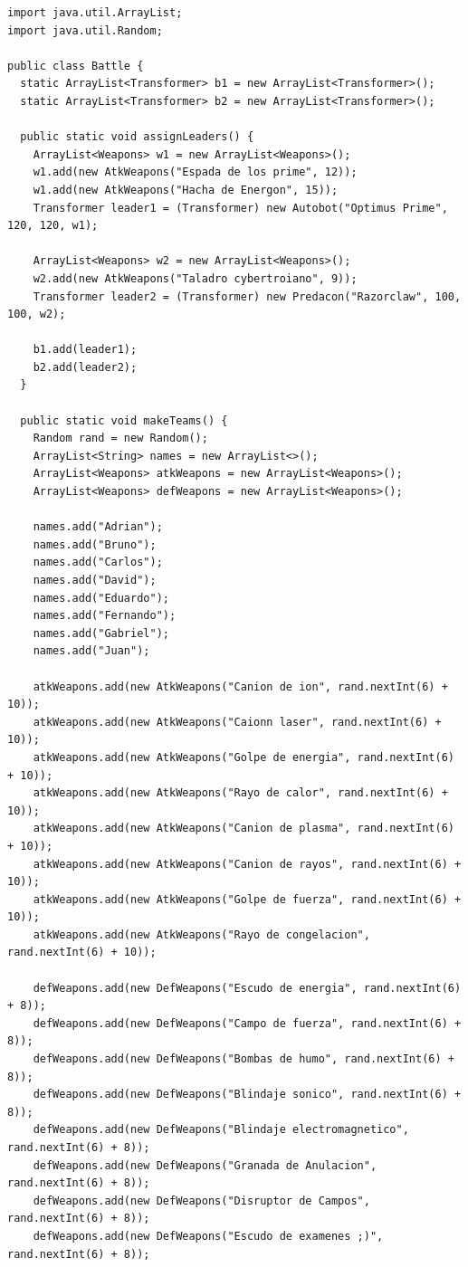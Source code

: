 \documentclass[12pt]{article}
\begin{document}
\begin{enumerate}[label = \arabic{enumi}]
\begin{lstlisting}
import java.util.ArrayList;
import java.util.Random;

public class Battle {
  static ArrayList<Transformer> b1 = new ArrayList<Transformer>();
  static ArrayList<Transformer> b2 = new ArrayList<Transformer>();
  
  public static void assignLeaders() {
    ArrayList<Weapons> w1 = new ArrayList<Weapons>();
    w1.add(new AtkWeapons("Espada de los prime", 12));
    w1.add(new AtkWeapons("Hacha de Energon", 15));
    Transformer leader1 = (Transformer) new Autobot("Optimus Prime", 120, 120, w1);

    ArrayList<Weapons> w2 = new ArrayList<Weapons>();
    w2.add(new AtkWeapons("Taladro cybertroiano", 9));
    Transformer leader2 = (Transformer) new Predacon("Razorclaw", 100, 100, w2);

    b1.add(leader1);
    b2.add(leader2);
  }

  public static void makeTeams() {
    Random rand = new Random();
    ArrayList<String> names = new ArrayList<>();
    ArrayList<Weapons> atkWeapons = new ArrayList<Weapons>();
    ArrayList<Weapons> defWeapons = new ArrayList<Weapons>();
    
    names.add("Adrian");
    names.add("Bruno");
    names.add("Carlos");
    names.add("David");
    names.add("Eduardo");
    names.add("Fernando");
    names.add("Gabriel");
    names.add("Juan");
    
    atkWeapons.add(new AtkWeapons("Canion de ion", rand.nextInt(6) + 10));
    atkWeapons.add(new AtkWeapons("Caionn laser", rand.nextInt(6) + 10));
    atkWeapons.add(new AtkWeapons("Golpe de energia", rand.nextInt(6) + 10));
    atkWeapons.add(new AtkWeapons("Rayo de calor", rand.nextInt(6) + 10));
    atkWeapons.add(new AtkWeapons("Canion de plasma", rand.nextInt(6) + 10));
    atkWeapons.add(new AtkWeapons("Canion de rayos", rand.nextInt(6) + 10));
    atkWeapons.add(new AtkWeapons("Golpe de fuerza", rand.nextInt(6) + 10));
    atkWeapons.add(new AtkWeapons("Rayo de congelacion", rand.nextInt(6) + 10));
    
    defWeapons.add(new DefWeapons("Escudo de energia", rand.nextInt(6) + 8));
    defWeapons.add(new DefWeapons("Campo de fuerza", rand.nextInt(6) + 8));
    defWeapons.add(new DefWeapons("Bombas de humo", rand.nextInt(6) + 8));
    defWeapons.add(new DefWeapons("Blindaje sonico", rand.nextInt(6) + 8));
    defWeapons.add(new DefWeapons("Blindaje electromagnetico", rand.nextInt(6) + 8));
    defWeapons.add(new DefWeapons("Granada de Anulacion", rand.nextInt(6) + 8));
    defWeapons.add(new DefWeapons("Disruptor de Campos", rand.nextInt(6) + 8));
    defWeapons.add(new DefWeapons("Escudo de examenes ;)", rand.nextInt(6) + 8));
    

\end{lstlisting}
\end{enumerate}
\end{document}
